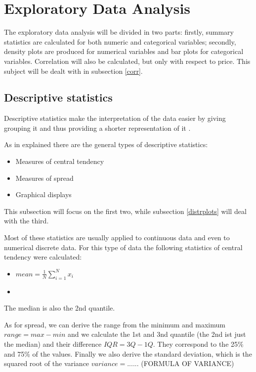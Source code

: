 \section{Exploratory Data Analysis}\label{Sec:Exploratory}

The exploratory data analysis will be divided in two parts: firstly, summary statistics are calculated for both numeric and categorical variables; secondly, density plots are produced for numerical variables and bar plots for categorical variables. Correlation will also be calculated, but only with respect to price. This subject will be dealt with in subsection \ref{corr}.

\subsection{Descriptive statistics}\label{subsec:descriptive}

Descriptive statistics make the interpretation of the data easier by giving grouping it and thus providing a shorter representation of it \citep{descrstat:2014}.

As in \cite{descrstat:2014} explained there are the general types of descriptive statistics:
\begin{itemize}
\item Measures of central tendency
\item Measures of spread
\item Graphical displays
\end{itemize}

This subsection will focus on the first two, while subsection 
\ref{distrplots} will deal with the third.

Most of these statistics are usually applied to continuous data and even to numerical discrete data.
For this type of data the following statistics of central tendency were calculated:
\begin{itemize}

\item $mean = \frac{1}{N}\sum\limits_{i=1}^{N}x_i$

\item 

\end{itemize}

The median is also the 2nd quantile.

As for spread, we can derive the range from the minimum and maximum $range = max - min$ and we calculate the 1st and 3nd quantile (the 2nd ist just the median) and their difference $IQR = 3Q - 1Q$. They correspond to the 25\% and 75\% of the values. Finally we also derive the standard deviation, which is the squared root of the variance $variance = ......$ (FORMULA OF VARIANCE)


